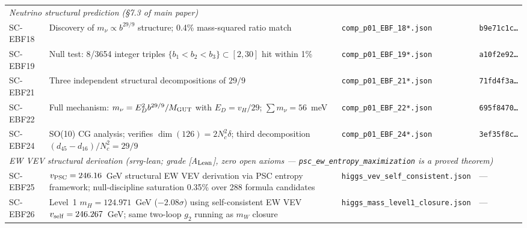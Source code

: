 \documentclass[10pt]{article}
\begin{document}
\begin{longtable}{@{} p{1.4cm} p{5.0cm} p{4.0cm} p{3.4cm} @{}}
\multicolumn{4}{l}{\textit{Neutrino structural prediction (\S7.3 of main paper)}} \\[2pt]
SC-EBF18 & Discovery of $m_\nu \propto b^{29/9}$ structure; 0.4\% mass-squared ratio match & \nolinkurl{comp_p01_EBF_18*.json} & \texttt{b9e71c1c\ldots} \\
SC-EBF19 & Null test: 8/3654 integer triples $\{b_1 < b_2 < b_3\} \subset [2,30]$ hit within 1\% & \nolinkurl{comp_p01_EBF_19*.json} & \texttt{a10f2e92\ldots} \\
SC-EBF21 & Three independent structural decompositions of $29/9$ & \nolinkurl{comp_p01_EBF_21*.json} & \texttt{71fd4f3a\ldots} \\
SC-EBF22 & Full mechanism: $m_\nu = E_D^2 b^{29/9}/M_{\rm GUT}$ with $E_D = v_H/29$; $\sum m_\nu = 56$~meV & \nolinkurl{comp_p01_EBF_22*.json} & \texttt{695f8470\ldots} \\
SC-EBF24 & SO(10) CG analysis; verifies $\dim(126) = 2N_c^2\delta$; third decomposition $(d_{45}-d_{16})/N_c^2 = 29/9$ & \nolinkurl{comp_p01_EBF_24*.json} & \texttt{3ef35f8c\ldots} \\[6pt]

\multicolumn{4}{l}{\textit{EW VEV structural derivation (srrg-lean; grade [A$_{\rm Lean}$], zero open axioms --- \texttt{psc\_ew\_entropy\_maximization} is a proved theorem)}} \\[2pt]
SC-EBF25 & $v_{\rm PSC} = 246.16$~GeV structural EW VEV derivation via PSC entropy framework; null-discipline saturation 0.35\% over 288 formula candidates & \nolinkurl{higgs_vev_self_consistent.json} & --- \\
SC-EBF26 & Level~1 $m_H = 124.971$~GeV ($-2.08\sigma$) using self-consistent EW VEV $v_{\rm self} = 246.267$~GeV; same two-loop $g_2$ running as $m_W$ closure & \nolinkurl{higgs_mass_level1_closure.json} & --- \\[6pt]


\end{longtable}
\end{document}

